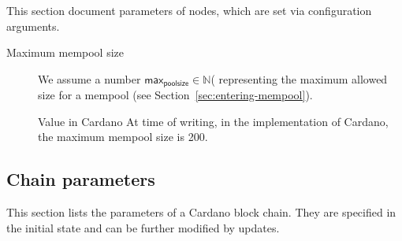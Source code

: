 \documentclass{article}
\newenvironment{currentvalue}{\begin{bclogo}[noborder=true,
    logo=\bcinfo, epBarre=3, couleurBarre=YellowOrange]{Value in Cardano}}{\end{bclogo}}
\newcommand{\maxmempoolsize}{\mathsf{max}_{\mathsf{poolsize}}}
\begin{document}
This section document parameters of nodes, which are set via
configuration arguments.

\begin{description}
\item[Maximum mempool size] We assume a number $\maxmempoolsize ∈ ℕ$(
  representing the maximum allowed size for a mempool (see
  Section~\ref{sec:entering-mempool}).
  \begin{currentvalue}
    At time of writing, in the implementation of Cardano, the maximum
    mempool size is 200.
  \end{currentvalue}
\end{description}

\subsection{Chain parameters}
\label{sec:chain-parameters}

This section lists the parameters of a Cardano block chain. They are
specified in the initial state and can be further modified by updates.
\end{document}
